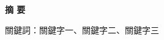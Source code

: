 {}
\begin{center}
  {\bfseries\chinnesesize 摘 要}
\end{center}



\noindent 關鍵詞：關鍵字一、關鍵字二、關鍵字三

\clearpage
